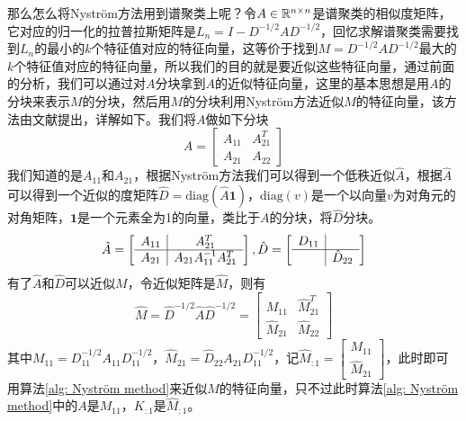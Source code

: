 那么怎么将Nyström方法用到谱聚类上呢？令$A \in \mathbb{R}^{n \times n}$是谱聚类的相似度矩阵，它对应的归一化的拉普拉斯矩阵是$L_n = I - D^{-1/2}AD^{-1/2}$，回忆求解谱聚类需要找到$L_n$的最小的$k$个特征值对应的特征向量，这等价于找到$M = D^{-1/2}AD^{-1/2}$最大的$k$个特征值对应的特征向量，所以我们的目的就是要近似这些特征向量，通过前面的分析，我们可以通过对$A$分块拿到$A$的近似特征向量，这里的基本思想是用$A$的分块来表示$M$的分块，然后用$M$的分块利用Nyström方法近似$M$的特征向量，该方法由文献\cite{fowlkes2004spectral}提出，详解如下。我们将$A$做如下分块
\begin{equation*}
    A = \left[\begin{array}{c|c}
        A_{11} & A_{21}^T \\
      \hline
      A_{21} & A_{22}
    \end{array}\right]
\end{equation*}
我们知道的是$A_{11}$和$A_{21}$，根据Nyström方法我们可以得到一个低秩近似$\hat{A}$，根据$\hat{A}$可以得到一个近似的度矩阵$\hat{D} = \text{diag}(\hat{A}\mathbf{1})$，$\text{diag}(v)$是一个以向量$v$为对角元的对角矩阵，$\mathbf{1}$是一个元素全为1的向量，类比于$A$的分块，将$\hat{D}$分块。
\begin{equation*}
    \hat{A} = \left[\begin{array}{c|c}
        A_{11} & A_{21}^T \\
      \hline
      A_{21} & A_{21}A_{11}^{-1}A_{21}^T
    \end{array}\right],
    \hat{D} = \left[\begin{array}{c|c}
        D_{11} &  \\
      \hline
      & \hat{D}_{22}
    \end{array}\right]
\end{equation*}
有了$\hat{A}$和$\hat{D}$可以近似$M$，令近似矩阵是$\hat{M}$，则有
\begin{equation*}
    \hat{M} = \hat{D}^{-1/2}\hat{A}\hat{D}^{-1/2} = \left[\begin{array}{c|c}
        M_{11} & \hat{M}_{21}^T \\
      \hline
      \hat{M}_{21} & \hat{M}_{22}
    \end{array}\right]
\end{equation*}
其中$M_{11} = D_{11}^{-1/2}A_{11}D_{11}^{-1/2}$，$\hat{M}_{21} = \hat{D}_{22}A_{21}D_{11}^{-1/2}$，记$\hat{M}_{:1} = \begin{bmatrix}
    M_{11} \\
    \hat{M}_{21}
\end{bmatrix}$，此时即可用算法\ref{alg: Nyström method}来近似$M$的特征向量，只不过此时算法\ref{alg: Nyström method}中的$A$是$M_{11}$，$K_{:1}$是$\hat{M}_{:1}$。

